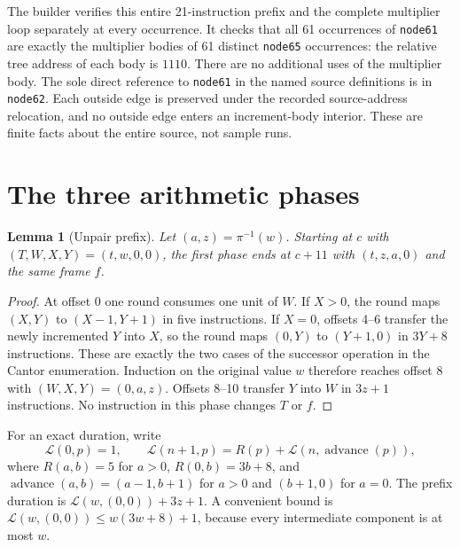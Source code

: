 \documentclass[11pt]{article}
\newtheorem{lemma}{Lemma}
\begin{document}
The builder verifies this entire 21-instruction prefix and the complete
multiplier loop separately at every occurrence.  It checks that all 61
occurrences of \texttt{node61} are exactly the multiplier bodies of 61
distinct \texttt{node65} occurrences: the relative tree address of each
body is $1110$.  There are no additional uses of the multiplier body.  The
sole direct reference to \texttt{node61} in the named source definitions is
in \texttt{node62}.  Each outside edge is preserved under the recorded
source-address relocation, and no outside edge enters an increment-body
interior.  These are finite facts about the entire source, not sample runs.

\section{The three arithmetic phases}

\begin{lemma}[Unpair prefix]
Let $(a,z)=\pi^{-1}(w)$.  Starting at $c$ with
$(T,W,X,Y)=(t,w,0,0)$, the first phase ends at $c+11$ with
$(t,z,a,0)$ and the same frame $f$.
\end{lemma}
\begin{proof}
At offset 0 one round consumes one unit of $W$.  If $X>0$, the round maps
$(X,Y)$ to $(X-1,Y+1)$ in five instructions.  If $X=0$, offsets 4--6
transfer the newly incremented $Y$ into $X$, so the round maps
$(0,Y)$ to $(Y+1,0)$ in $3Y+8$ instructions.  These are exactly the two
cases of the successor operation in the Cantor enumeration.  Induction
on the original value $w$ therefore reaches offset 8 with
$(W,X,Y)=(0,a,z)$.  Offsets 8--10 transfer $Y$ into $W$ in $3z+1$
instructions.  No instruction in this phase changes $T$ or $f$.
\end{proof}

For an exact duration, write
\[
 \mathcal{L}(0,p)=1,\qquad
 \mathcal{L}(n+1,p)=R(p)+\mathcal{L}(n,\operatorname{advance}(p)),
\]
where $R(a,b)=5$ for $a>0$, $R(0,b)=3b+8$, and
$\operatorname{advance}(a,b)=(a-1,b+1)$ for $a>0$ and
$(b+1,0)$ for $a=0$.  The prefix duration is
$\mathcal{L}(w,(0,0))+3z+1$.  A convenient bound is
$\mathcal{L}(w,(0,0))\leq w(3w+8)+1$, because every intermediate
component is at most $w$.
\end{document}
